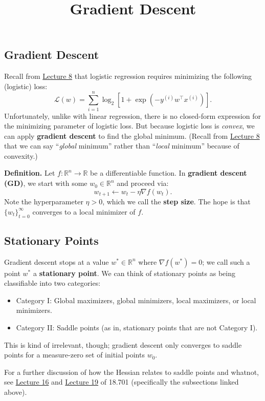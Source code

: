 \title{Gradient Descent}



\subsection{Gradient Descent}

Recall from \href{/6.790/lectures/8/#mle-logistic-regression}{Lecture 8}
that logistic regression requires minimizing
the following (logistic) loss:
\[ \mathcal{L}(w) = \sum_{i = 1}^n \log_2\left[
    1 + \exp\left(-y^{(i)}w^{\top}x^{(i)}\right)
\right]. \]
Unfortunately, unlike with linear regression,
there is no closed-form expression
for the minimizing parameter of logistic loss.
But because logistic loss is \emph{convex},
we can apply \textbf{gradient descent} to find the global minimum.
(Recall from \href{/6.790/lectures/8/#addendum-convexity}{Lecture 8}
that we can say ``\emph{global} minimum'' rather than
``\emph{local} minimum'' because of convexity.)

\textbf{Definition.}
Let $f \colon \mathbb{R}^n \to \mathbb{R}$ be a differentiable function.
In \textbf{gradient descent (GD)},
we start with some $w_0 \in \mathbb{R}^n$
and proceed via:
\[ w_{t + 1} \leftarrow w_t - \eta \nabla f(w_t). \]
Note the hyperparameter $\eta > 0$,
which we call the \textbf{step size}.
The hope is that $\{w_t\}_{t = 0}^{\infty}$
converges to a local minimizer of $f$.

\subsection{Stationary Points}

Gradient descent stops at a value $w^* \in \mathbb{R}^n$
where $\nabla f(w^*) = 0$; we call such a point $w^*$
a \textbf{stationary point}.
We can think of stationary points as
being classifiable into two categories:
\begin{itemize}
    \item Category I: Global maximizers, global minimizers,
    local maximizers, or local minimizers.
    \item Category II: Saddle points
    (as in, stationary points that are not Category I).
\end{itemize}
This is kind of irrelevant, though;
gradient descent only converges to saddle points
for a measure-zero set of initial points $w_0$.

For a further discussion of how the Hessian relates
to saddle points and whatnot, see
\href{/18.701/lectures/16/#foreshadowing-quadratic-polynomials-are-bilinear-forms}{Lecture 16}
and \href{/18.701/lectures/19/#spectral-application-1-classifying-quadric-surfaces}{Lecture 19}
of 18.701 (specifically the subsections linked above).

